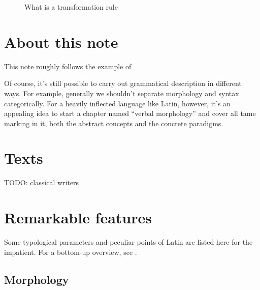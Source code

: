 \documentclass[a4paper, oneside]{report}
\begin{document}
\begin{figure}[H]
    \caption{What is a transformation rule}
    \label{fig:transformation-rule}        
\end{figure}

\section{About this note}

This note roughly follows the example of 

Of course, it's still possible to carry out grammatical description in different ways.  
For example, generally we shouldn't separate morphology and syntax categorically.
For a heavily inflected language like Latin, however, 
it's an appealing idea 
to start a chapter named ``verbal morphology''
and cover all \acs{tame} marking in it, 
both the abstract concepts and the concrete paradigms. 

\section{Texts}

TODO: classical writers

\section{Remarkable features}

Some typological parameters and peculiar points of Latin are listed here for the impatient.
For a bottom-up overview, 
see .

\subsection{Morphology}
\end{document}
